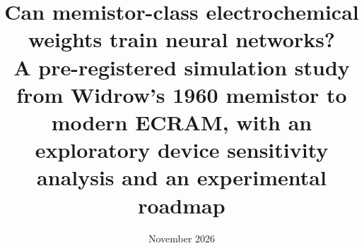 \usepackage[T1]{fontenc}
\usepackage[utf8]{inputenc}
\usepackage{lmodern}
\usepackage[margin=1in]{geometry}
\usepackage{amsmath,amssymb}
\usepackage{graphicx}
\usepackage{booktabs}
\usepackage[section]{placeins}
\setlength{\emergencystretch}{1.5em}
\usepackage{url}
\usepackage[hidelinks]{hyperref}
\usepackage[numbers,sort&compress]{natbib}
\newsavebox{\fitboxbox}
\makeatletter
\newcommand{\fitbox}[1]{\sbox{\fitboxbox}{#1}\typeout{FITBOX table=\thetable\space wd=\the\wd\fitboxbox\space tw=\the\textwidth\space size=\f@size}%
  \resizebox{\ifdim\wd\fitboxbox>\textwidth\textwidth\else\wd\fitboxbox\fi}{!}{\usebox{\fitboxbox}}}
\makeatother





\title{Can memistor-class electrochemical weights train neural networks?\\[2pt]
\large A pre-registered simulation study from Widrow's 1960 memistor to modern ECRAM, with an exploratory device
sensitivity analysis and an experimental roadmap}
\authorblock
\date{November 2026}
